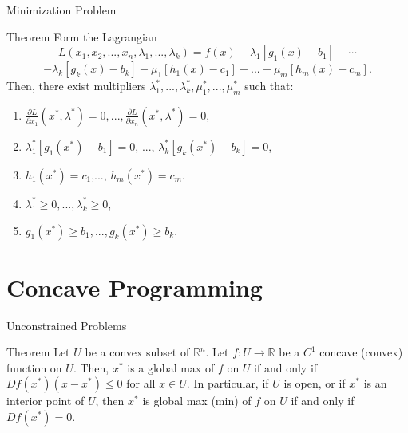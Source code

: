 \documentclass{beamer}
\begin{document}
\begin{frame}{Minimization Problem}
 \begin{block}{Theorem}
   Form the Lagrangian
   \[L(x_1,x_2,..., x_n,\lambda_1,..., \lambda_k)= f(x)-\lambda_1 [g_1(x)-b_1]-\cdots\]
   \[ -\lambda_k[g_k(x)-b_k]-\mu_1[h_1(x)-c_1]-...-\mu_m [h_m(x)-c_m]. 
    \]
    Then, there exist multipliers $\lambda_1^*,...,\lambda_k^*, \mu_1^*,..., \mu_m^* $ such that:
    \begin{enumerate}
        \item $\frac{\partial L}{\partial x_1}(x^*,  \lambda^*)=0,...,\frac{\partial L}{\partial x_n}(x^*,  \lambda^*)=0$, 
        \item $\lambda_1^*[g_1(x^*)-b_1]=0$, ..., $\lambda_k^*[g_k(x^*)-b_k]=0$,
        \item $h_1(x^*)=c_1$,..., $h_m(x^*)=c_m$.
        \item $\lambda_1^*\geq 0,..., \lambda_k^*\geq 0$,
        \item $g_1(x^*)\geq b_1,..., g_k(x^*)\geq b_k$.
    \end{enumerate}
    \end{block}
\end{frame}
\section{Concave Programming}
\begin{frame}{Unconstrained Problems}
    \begin{block}{Theorem}
        Let $U$ be a convex subset of $\mathbb{R}^n$. Let $f:U\to \mathbb{R}$ be a $C^1$ concave (convex) function on $U$. Then, $x^*$ is a global max of $f$ on $U$ if and only if $Df(x^*)(x-x^*)\leq 0$ for all $x\in U$. In particular, if $U$ is open, or if $x^*$ is an interior point of $U$, then $x^*$ is global max (min) of $f$ on $U$ if and only if $Df(x^*)=0$.
    \end{block}
\end{frame}
\end{document}
